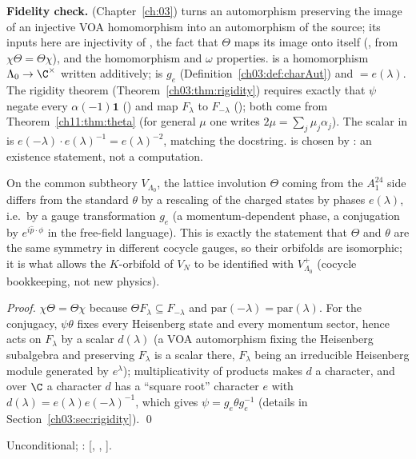 \begin{dictionary}
\textbf{Fidelity check.}   (Chapter~\ref{ch:03}) turns an automorphism preserving the
image of an injective VOA homomorphism into an automorphism of the source; its inputs here are
injectivity of , the fact that $\Theta$ maps its image onto itself
(, from $\chi\Theta=\Theta\chi$), and the homomorphism and $\omega$
properties.   is a homomorphism $\Lambda_0\to\C^\times$ written
additively;  is $g_e$ (Definition~\ref{ch03:def:charAut}) and 
$=e(\lambda)$.  The rigidity theorem  (Theorem~\ref{ch03:thm:rigidity})
requires exactly that $\psi$ negate every $\alpha(-1)\mathbf 1$ () and map $F_\lambda$ to
$F_{-\lambda}$ (); both come from Theorem~\ref{ch11:thm:theta} (for general
$\mu$ one writes $2\mu=\sum_j\mu_j\alpha_j$).  The scalar in  is
$e(-\lambda)\cdot e(\lambda)^{-1}=e(\lambda)^{-2}$, matching the docstring.   is chosen by
: an existence statement, not a computation.
\end{dictionary}

\begin{physics}
On the common subtheory $V_{\Lambda_0}$, the lattice involution $\Theta$ coming from the $A_1^{24}$ side differs from the standard $\theta$ by a rescaling of the charged states by phases $e(\lambda)$, i.e.\ by a gauge transformation $g_e$ (a momentum-dependent phase, a conjugation by $e^{i\hat p\cdot\phi}$ in the free-field language). This is exactly the statement that $\Theta$ and $\theta$ are the same symmetry in different cocycle gauges, so their orbifolds are isomorphic; it is what allows the $K$-orbifold of $V_N$ to be identified with $V_{\Lambda_0}^+$ (cocycle bookkeeping, not new physics).
\end{physics}
\emph{Proof.}  $\chi\Theta=\Theta\chi$ because $\Theta F_\lambda\subseteq F_{-\lambda}$ and
$\mathrm{par}(-\lambda)=\mathrm{par}(\lambda)$.  For the conjugacy, $\psi\theta$ fixes every Heisenberg
state and every momentum sector, hence acts on $F_\lambda$ by a scalar $d(\lambda)$ (a VOA automorphism
fixing the Heisenberg subalgebra and preserving $F_\lambda$ is a scalar there, $F_\lambda$ being an
irreducible Heisenberg module generated by $e^\lambda$); multiplicativity of products makes $d$ a
character, and over $\C$ a character $d$ has a ``square root'' character $e$ with $d(\lambda)=
e(\lambda)e(-\lambda)^{-1}$, which gives $\psi=g_e\theta g_e^{-1}$ (details in
Section~\ref{ch03:sec:rigidity}). \qed
\begin{status}Unconditional; : [, ,
].\end{status}

